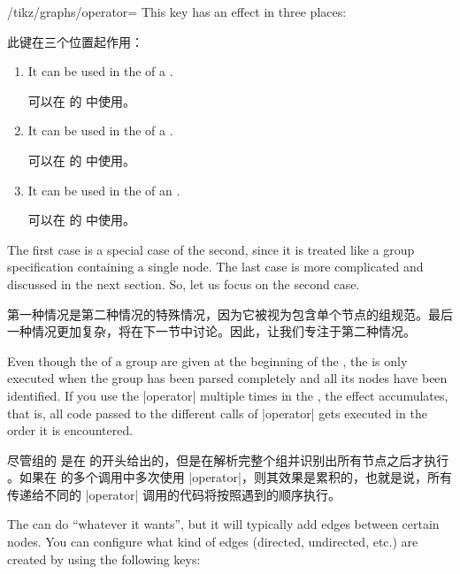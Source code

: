 \begin{key}{/tikz/graphs/operator=}
    This key has an effect in three places:
    
    此键在三个位置起作用：

%
    \begin{enumerate}
        \item It can be used in the  of a .

            可以在  的  中使用。
        \item It can be used in the  of a .

            可以在  的  中使用。
        \item It can be used in the  of an .

            可以在  的  中使用。


    \end{enumerate}
    The first case is a special case of the second, since it is treated like a
    group specification containing a single node. The last case is more
    complicated and discussed in the next section. So, let us focus on the
    second case.

    第一种情况是第二种情况的特殊情况，因为它被视为包含单个节点的组规范。最后一种情况更加复杂，将在下一节中讨论。因此，让我们专注于第二种情况。



    Even though the  of a group are given at the beginning of the
    , the  is only executed when the group
    has been parsed completely and all its nodes have been identified. If you
    use the |operator| multiple times in the , the effect
    accumulates, that is, all code passed to the different calls of |operator|
    gets executed in the order it is encountered.

    尽管组的  是在  的开头给出的，但是在解析完整个组并识别出所有节点之后才执行 。如果在  的多个调用中多次使用 |operator|，则其效果是累积的，也就是说，所有传递给不同的 |operator| 调用的代码将按照遇到的顺序执行。

    The  can do ``whatever it wants'', but it will typically add
    edges between certain nodes. You can configure what kind of edges
    (directed, undirected, etc.) are created by using the following keys:


\end{key}

